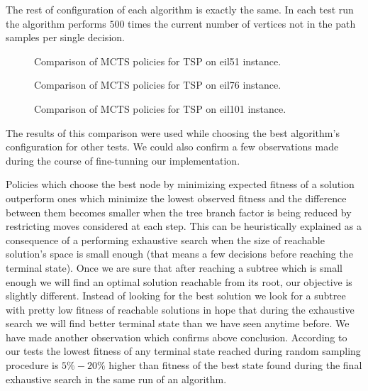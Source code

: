 The rest of configuration of each algorithm is exactly the same. In each test
run the algorithm performs $500$ times the current number of vertices not in
the path samples per single decision.

\FloatBarrier
\begin{figure}[ht]
  \centering
  
  \caption{Comparison of MCTS policies for TSP on eil51 instance.}
\end{figure}

\begin{figure}[ht]
  \centering
  
  \caption{Comparison of MCTS policies for TSP on eil76 instance.}
\end{figure}

\begin{figure}[ht]
  \centering
  
  \caption{Comparison of MCTS policies for TSP on eil101 instance.}
\end{figure}
\FloatBarrier

The results of this comparison were used while choosing the best algorithm's
configuration for other tests. We could also confirm a few observations made
during the course of fine-tunning our implementation.

Policies which choose the best node by minimizing expected fitness of a
solution outperform ones which minimize the lowest observed fitness and the
difference between them becomes smaller when the tree branch factor is being
reduced by restricting moves considered at each step. This can be heuristically
explained as a consequence of a performing exhaustive search when the size of
reachable solution's space is small enough (that means a few decisions before
reaching the terminal state). Once we are sure that after reaching a subtree
which is small enough we will find an optimal solution reachable from its root,
our objective is slightly different. Instead of looking for the best solution
we look for a subtree with pretty low fitness of reachable solutions in hope
that during the exhaustive search we will find better terminal state than we
have seen anytime before. We have made another observation which confirms above
conclusion. According to our tests the lowest fitness of any terminal state
reached during random sampling procedure is $5\% - 20\%$ higher than fitness of
the best state found during the final exhaustive search in the same run of an
algorithm.

